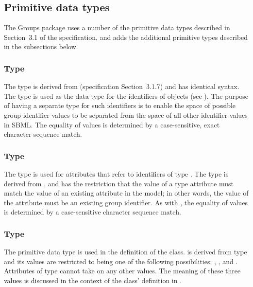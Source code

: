 \subsection{Primitive data types}
\label{new-primitive-types}

The Groups package uses a number of the primitive data types described in Section~3.1 of the \sbmlthreecore specification, and adds the additional primitive types described in the subsections below.


\subsubsection{Type \fixttspace{}}
\label{primtype-groupsid}

The type  is derived from  (\sbmlthreecore specification Section~3.1.7) and has identical syntax.  The  type is used as the data type for the identifiers of \Group objects (see ).  The purpose of having a separate type for such identifiers is to enable the space of possible group identifier values to be separated from the space of all other identifier values in SBML.  The equality of  values is determined by a case-sensitive, exact character sequence match.


\subsubsection{Type \fixttspace{}}
\label{primtype-groupsidref}

The type  is used for attributes that refer to identifiers of type .  The type is derived from , and has the restriction that the value of a  type attribute must match the value of an existing  attribute in the model; in other words, the value of the attribute must be an existing group identifier.  As with , the equality of  values is determined by a case-sensitive character sequence match.


\subsubsection{Type \fixttspace{}}
\label{primtype-groupkind}

The  primitive data type is used in the definition of the \Group class.   is derived from type  and its values are restricted to being one of the following possibilities: , , and .  Attributes of type  cannot take on any other values.  The meaning of these three values is discussed in the context of the \Group class' definition in .


